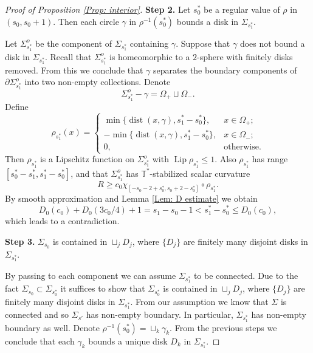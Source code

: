 \documentclass[10pt,a4paper]{amsart}
\DeclareMathOperator{\Lip}{Lip}
\DeclareMathOperator{\dist}{dist}
\begin{document}
\begin{proof}[Proof of Proposition \ref{Prop: interior}]
\medskip

\noindent
{\bf Step 2.} Let $s_0^*$ be a regular value of $\rho$ in $(s_0,s_0+1)$. Then each circle $\gamma$ in $\rho^{-1}(s_0^*)$ bounds a disk in $\Sigma_{s_{1}^{*}}$.

\medskip

Let $\Sigma_{s_1^*}^o$ be the component of $\Sigma_{s_1^*}$ containing $\gamma$. Suppose that $\gamma$ does not bound a disk in $\Sigma_{s_1^*}$. Recall that $\Sigma_{s_1^*}^{o}$ is homeomorphic to a $2$-sphere with finitely disks removed. From this we conclude that $\gamma$ separates the boundary components of $\partial\Sigma_{s_1^*}^o$ into two non-empty collections. Denote
$$\Sigma_{s_1^*}^o-\gamma=\Omega_+\sqcup \Omega_-.$$
Define
\begin{equation*}
\rho_{s_1^*}(x)=\left\{
\begin{array}{cc}
\min\{\dist(x,\gamma), s_1^*-s_0^*\},& x\in \Omega_+;\\[1mm]
-\min\{\dist(x,\gamma), s_1^*-s_0^*\},& x\in \Omega_-;\\[1mm]
0,&\mbox{otherwise}.
\end{array}\right.
\end{equation*}
Then $\rho_{s_1^*}$ is a Lipschitz function on $\Sigma_{s_1^*}^o$ with $\Lip \rho_{s_1^*}\leq1$. Also $\rho_{s_1^*}$ has range $[s_0^*-s_1^*,s_1^*-s_0^*]$, and that $\Sigma_{s_1^*}^o$ has $\mathbb{T}^*$-stabilized scalar curvature $$R\geq c_0\chi_{[-s_0-2+s_0^*,s_0+2-s_0^*]}\circ \rho_{s_1^*}.$$
By smooth approximation and Lemma \ref{Lem: D estimate} we obtain
$$
D_0(c_0)+D_0(3c_0/4)+1 = s_{1}-s_{0}-1 < s_1^*-s_0^*\leq D_0(c_0),
$$
which leads to a contradiction.

\medskip

\noindent
{\bf Step 3.} $\Sigma_{s_0}$ is contained in $\sqcup_j D_j$, where $\{D_j\}$ are finitely many disjoint disks in $\Sigma_{s_1^*}$.

\medskip

By passing to each component we can assume $\Sigma_{s_1^*}$ to be connected. Due to the fact $\Sigma_{s_0}\subset \Sigma_{s_0^*}$ it suffices to show that $\Sigma_{s_0^*}$ is contained in $\sqcup_j D_j$, where $\{D_j\}$ are finitely many disjoint disks in $\Sigma_{s_1^*}$. From our assumption we know that $\Sigma$ is connected and so $\Sigma_{s'}$ has non-empty boundary. In particular, $\Sigma_{s_1^*}$ has non-empty boundary as well. Denote $\rho^{-1}(s_0^*)=\sqcup_k\gamma_k$. From the previous steps we conclude that each $\gamma_k$ bounds a unique disk $D_k$ in $\Sigma_{s_1^*}$.


\end{proof}
\end{document}

